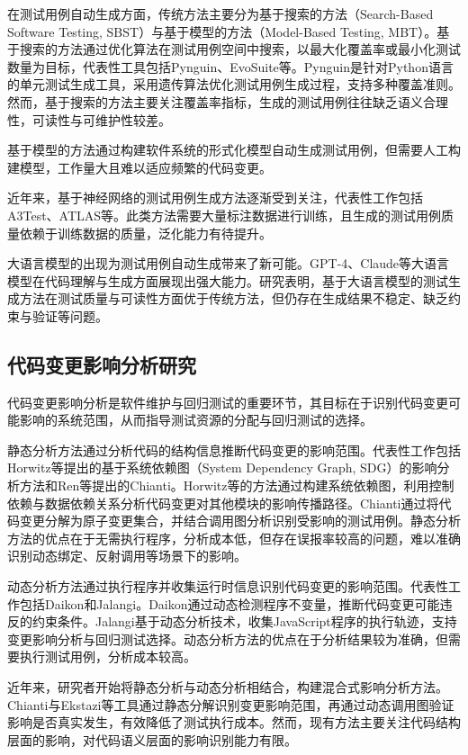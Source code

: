在测试用例自动生成方面，传统方法主要分为基于搜索的方法（Search-Based Software Testing, SBST）与基于模型的方法（Model-Based Testing, MBT）\cite{AliBriand2007}。基于搜索的方法通过优化算法在测试用例空间中搜索，以最大化覆盖率或最小化测试数量为目标，代表性工具包括Pynguin、EvoSuite等。Pynguin是针对Python语言的单元测试生成工具，采用遗传算法优化测试用例生成过程，支持多种覆盖准则\cite{LukasczykKF2023}。然而，基于搜索的方法主要关注覆盖率指标，生成的测试用例往往缺乏语义合理性，可读性与可维护性较差。

基于模型的方法通过构建软件系统的形式化模型自动生成测试用例，但需要人工构建模型，工作量大且难以适应频繁的代码变更。

近年来，基于神经网络的测试用例生成方法逐渐受到关注，代表性工作包括A3Test、ATLAS等\cite{Watson2019}。此类方法需要大量标注数据进行训练，且生成的测试用例质量依赖于训练数据的质量，泛化能力有待提升。

大语言模型的出现为测试用例自动生成带来了新可能。GPT-4、Claude等大语言模型在代码理解与生成方面展现出强大能力。研究表明，基于大语言模型的测试生成方法在测试质量与可读性方面优于传统方法，但仍存在生成结果不稳定、缺乏约束与验证等问题\cite{Riedel2023LLMTest}。

\subsection{代码变更影响分析研究}
代码变更影响分析是软件维护与回归测试的重要环节，其目标在于识别代码变更可能影响的系统范围，从而指导测试资源的分配与回归测试的选择\cite{BohnerArnold1996}。

静态分析方法通过分析代码的结构信息推断代码变更的影响范围。代表性工作包括Horwitz等提出的基于系统依赖图（System Dependency Graph, SDG）的影响分析方法\cite{Horwitz1990}和Ren等提出的Chianti\cite{Ren2004}。Horwitz等的方法通过构建系统依赖图，利用控制依赖与数据依赖关系分析代码变更对其他模块的影响传播路径。Chianti通过将代码变更分解为原子变更集合，并结合调用图分析识别受影响的测试用例。静态分析方法的优点在于无需执行程序，分析成本低，但存在误报率较高的问题，难以准确识别动态绑定、反射调用等场景下的影响。

动态分析方法通过执行程序并收集运行时信息识别代码变更的影响范围。代表性工作包括Daikon\cite{Ernst2001Daikon}和Jalangi\cite{Sen2015}。Daikon通过动态检测程序不变量，推断代码变更可能违反的约束条件。Jalangi基于动态分析技术，收集JavaScript程序的执行轨迹，支持变更影响分析与回归测试选择。动态分析方法的优点在于分析结果较为准确，但需要执行测试用例，分析成本较高。

近年来，研究者开始将静态分析与动态分析相结合，构建混合式影响分析方法。Chianti与Ekstazi等工具通过静态分解识别变更影响范围，再通过动态调用图验证影响是否真实发生，有效降低了测试执行成本\cite{Ren2004,Gligoric2015Ekstazi}。然而，现有方法主要关注代码结构层面的影响，对代码语义层面的影响识别能力有限。

